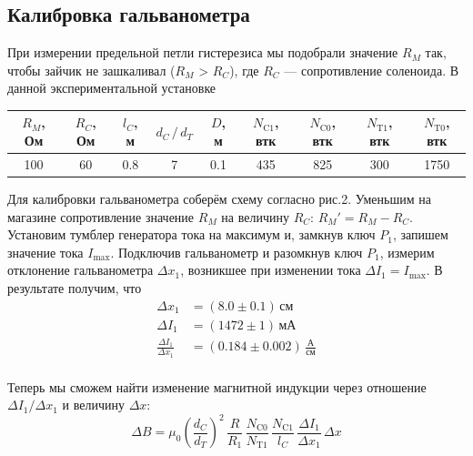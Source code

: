 \documentclass[12pt]{article}
\begin{document}
\subsection*{Калибровка гальванометра}
\par
	При измерении предельной петли гистерезиса мы подобрали значение $R_M$ так, чтобы зайчик не зашкаливал ($R_M$ > $R_C$), где $R_C$ --- сопротивление соленоида. В данной экспериментальной установке
	\begin{table}[h!]
		\centering
		\begin{tabular}{|c|c|c|c|c|c|c|c|c|}
		\hline
			$R_M$, Ом & $R_C$, Ом & $l_C$, м & $d_C \, / \, d_T$ & $D$, м & $N_\text{C1}$, втк & $N_\text{C0}$, втк & $N_\text{T1}$, втк & $N_\text{T0}$, втк \\
		\hline
			100 & 60 & 0.8 & 7 & 0.1 & 435 & 825 & 300 & 1750 \\
		\hline	
		\end{tabular}
	\end{table}
\par
	Для калибровки гальванометра соберём схему согласно рис.2. Уменьшим на магазине сопротивление значение $R_M$ на величину $R_C$: $R_M' = R_M - R_C$. Установим тумблер генератора тока на максимум и, замкнув ключ $P_1$, запишем значение тока $I_\text{max}$. Подключив гальванометр и разомкнув ключ $P_1$, измерим отклонение гальванометра $\Delta x_1$, возникшее при изменении тока $\Delta I_1 = I_\text{max}$. В результате получим, что
	\begin{align*}
		\Delta x_1  &= \left(8.0 \pm 0.1\right) \, \text{см} \\
		\Delta I_1 &= \left(1472 \pm 1 \right) \, \text{мА} \\
		\frac{\Delta I_1}{\Delta x_1} &= \left(0.184 \pm 0.002\right) \, \frac{\text{А}}{\text{см}} \\
	\end{align*} 
\par
	Теперь мы сможем найти изменение магнитной индукции через отношение $\Delta I_1 / \Delta x_1$ и величину $\Delta x$:
	\begin{equation}
		\Delta B = \mu_0 {\left(\frac{d_C}{d_T}\right)}^2\, \frac{R}{R_1} \, \frac{N_\text{C0}}{N_\text{T1}} \, \frac{N_\text{C1}}{l_C} \, \frac{\Delta I_1}{\Delta x_1} \, \Delta x \label{B}
	\end{equation}
\end{document}
